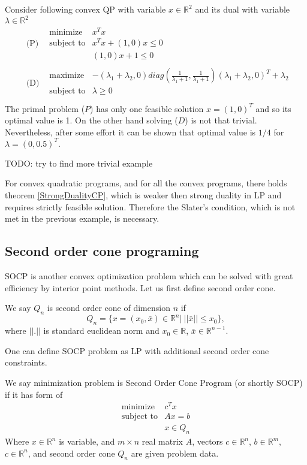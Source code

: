 \documentclass[10pt,oneside]{book}
\theoremstyle{definition}
\begin{document}
\ex  Consider following convex QP with variable $x\in \mathbb{R}^2$ and its dual with variable $\lambda\in\mathbb{R}^2$
\begin{eqnarray}
&\mbox{(P)}&\begin{array}{ll}
\mbox{minimize} & x^Tx \\
\mbox{subject to}&  x^Tx + (1,0)x \leq 0\\
& (1,0)x+1\leq 0
\end{array} \\
&\mbox{(D)}&\begin{array}{ll}
\mbox{maximize} & -(\lambda_1 + \lambda_2,0)
diag(\frac{1}{\lambda_1 + 1}, \frac{1}{\lambda_1 + 1}) (\lambda_1 + \lambda_2,0)^T + \lambda_2 \\
\mbox{subject to}&  \lambda \geq 0\\
\end{array} 
\end{eqnarray}
The primal problem ($P$) has only one feasible solution $x = (1,0)^T$ and so its optimal value is 1.
On the other hand solving ($D$) is not that trivial. Nevertheless, after some effort it can be shown that optimal value is $1/4$ for $\lambda = (0,0.5)^T.$

TODO: try to find more trivial example

For convex quadratic programs, and for all the convex programs, there holds  theorem \ref{StrongDualityCP}, which is weaker then strong duality in LP and requires strictly feasible solution. Therefore the Slater's condition, which is not met in the previous example, is necessary. 

\subsection{Second order cone programing}

SOCP is another convex optimization problem which can be solved with great efficiency by interior point methods. Let us first define second order cone.

\label{defSOC} We say $Q_n$ is second order cone of dimension $n$ if 
$$Q_n=\{x = (x_0,\bar{x}) \in \mathbb{R}^n|\ ||\bar{x}||\leq x_0\},$$
where $||.|| $ is standard euclidean norm and $x_0\in \mathbb{R}$, $\bar{x}\in \mathbb{R}^{n-1}$.

One can define SOCP problem as LP with additional second order cone constraints.

\label{defSOCP}
We say minimization problem is Second Order Cone Program (or shortly SOCP) if it has form of
\begin{equation}
\label{socp} 
\begin{array}{ll}
\mbox{minimize} & c^Tx\\
\mbox{subject to}& Ax = b\\
& x \in Q_n
\end{array} 
\tag{SOCP}
\end{equation}
Where $x\in \mathbb{R}^n$ is variable, and $m\times n$ real matrix $A$, vectors $c\in \mathbb{R}^n$, $b\in \mathbb{R}^{m},$ $c\in \mathbb{R}^n$, and second order cone $Q_n$ are given problem data.
\end{document}
